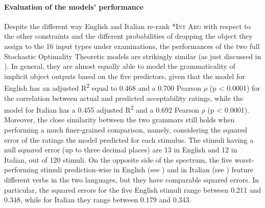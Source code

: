 \paragraph{Evaluation of the models' performance}
Despite the different way English and Italian re-rank \textsc{*Int Arg} with respect to the other constraints and the different probabilities of dropping the object they assign to the 16 input types under examinations, the performances of the two full Stochastic Optimality Theoretic models are strikingly similar (as just discussed in ). In general, they are almost equally able to model the grammaticality of implicit object outputs based on the five predictors, given that the model for English has an adjusted R\textsuperscript{2} equal to 0.468 and a 0.700 Pearson $\rho$ (p < 0.0001) for the correlation between actual and predicted acceptability ratings, while the model for Italian has a 0.455 adjusted R\textsuperscript{2} and a 0.692 Pearson $\rho$ (p < 0.0001).\\
Moreover, the close similarity between the two grammars still holds when performing a much finer-grained comparison, namely, considering the squared error of the ratings the model predicted for each stimulus. The stimuli having a null squared error (up to three decimal places) are 13 in English and 12 in Italian, out of 120 stimuli. On the opposite side of the spectrum, the five worst-performing stimuli prediction-wise in English (see ) and in Italian (see ) feature different verbs in the two languages, but they have comparable squared errors. In particular, the squared errors for the five English stimuli range between 0.211 and 0.348, while for Italian they range between 0.179 and 0.343.\\
